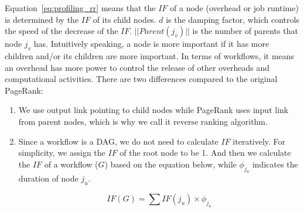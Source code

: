 Equation~\ref{eq:profiling_rr} means that the $IF$ of a node (overhead or job runtime) is determined by the $IF$ of its child nodes. $d$ is the damping factor, which controls the speed of the decrease of the $IF$. $||Parent(j_v)||$ is the number of parents that node $j_v$ has. Intuitively speaking, a node is more important if it has more children and/or its children are more important. In terms of workflows, it means an overhead has more power to control the release of other overheads and computational activities. There are two differences compared to the original PageRank:  
\begin{enumerate}
\item We use output link pointing to child nodes while PageRank uses input link from parent nodes, which is why we call it reverse ranking algorithm.
\item Since a workflow is a DAG, we do not need to calculate $IF$ iteratively. For simplicity, we assign the $IF$ of the root node to be 1. And then we calculate the $IF$ of a workflow ($G$) based on the equation below, while $\phi_{j_u}$ indicates the duration of node $j_u$.  

\begin{equation} \label{eq:profiling_sum_rr}
IF(G)=\sum_{}{}IF(j_u) \times \phi_{j_u}
\end{equation}

\end{enumerate}

